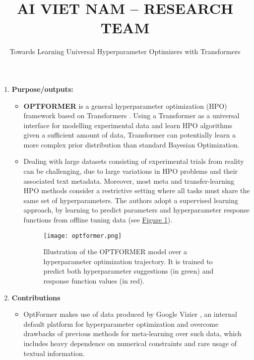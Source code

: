 \documentclass[11pt]{article}
\title{\LARGE AI VIET NAM – RESEARCH TEAM}
\author{\Large Towards Learning Universal Hyperparameter Optimizers with Transformers}
\begin{document}
\maketitle

\begin{enumerate}
    \item
    \textbf{Purpose/outputs:}
    \begin{itemize}
        \item \textbf{OPTFORMER} \cite{https://doi.org/10.48550/arxiv.2205.13320} is a general hyperparameter optimization (HPO) framework based on Transformers \cite{https://doi.org/10.48550/arxiv.1706.03762}. Using a Transformer as a universal interface for modelling experimental data and learn HPO algorithms given a sufficient amount of data, Transformer can potentially learn a more complex prior distribution than standard Bayesian Optimization.
        \item Dealing with large datasets consisting of experimental trials from reality can be challenging, due to large variations in HPO problems and their associated text metadata. Moreover, most meta and transfer-learning HPO methods consider a restrictive setting where all tasks must share the same set of hyperparameters. The authors adopt a supervised learning approach, by learning to predict parameters and hyperparameter response functions from offline tuning data (see \hyperref[fig:optformer]{Figure 1}).\\
        \medskip
        \begin{minipage}{\linewidth}
        \begin{figure}[H]
            \centering
            \texttt{[image: optformer.png]}
            \caption{Illustration of the OPTFORMER model over a hyperparameter optimization trajectory. It is trained to predict both hyperparameter suggestions (in green) and response function values (in red).}
            \label{fig:optformer}
        \end{figure}
        \end{minipage}
        \end{itemize}
    \item \textbf{Contributions}
    \begin{itemize}
            \item OptFormer makes use of data produced by Google Vizier \cite{46180}, an internal default platform for hyperparameter optimization and overcome drawbacks of previous methods for meta-learning over such data, which includes heavy dependence on numerical constraints and rare usage of textual information.

\end{itemize}
\end{enumerate}
\end{document}
